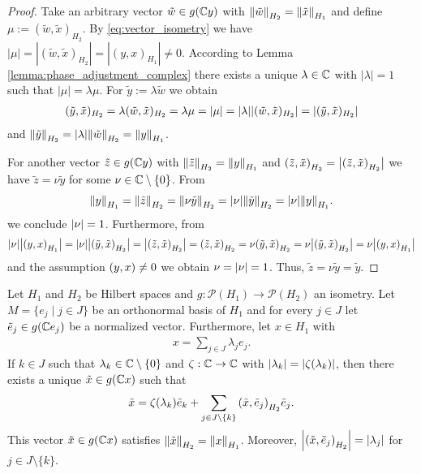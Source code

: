 \begin{proof}
	Take an arbitrary vector $\tilde{w} \in g(\C y)$ with $\norm[H_2]{\tilde{w}} = \norm[H_1]{\tilde{x}}$ and define $\mu := (\tilde{w}, \tilde{x})_{H_2}$. By \eqref{eq:vector_isometry} we have $|\mu| = |(\tilde{w},\tilde{x})_{H_2}| = |(y,x)_{H_1}| \neq 0$. According to Lemma \ref{lemma:phase_adjustment_complex} there exists a unique $\lambda \in \C$ with $|\lambda| = 1$ such that $|\mu| = \lambda \mu$. For $\tilde{y} := \lambda \tilde{w}$ we obtain
	\begin{align*}
		(\tilde{y}, \tilde{x})_{H_2} = \lambda (\tilde{w}, \tilde{x})_{H_2} = \lambda \mu = |\mu| = \vbraces{\lambda}|(\tilde{w}, \tilde{x})_{H_2}| = |(\tilde{y},\tilde{x})_{H_2}|
	\end{align*}
	and $\norm[H_2]{\tilde{y}} = |\lambda| \norm[H_2]{\tilde{w}} = \norm[H_1]{y}$.
	
	For another vector $\tilde{z} \in g\pbraces{\C y}$ with $\norm[H_2]{\tilde{z}} = \norm[H_1]{y}$ and $\pbraces{\tilde{z}, \tilde{x}}_{H_2} = \vbraces{\pbraces{\tilde{z}, \tilde{x}}_{H_2}}$ we have $\tilde{z} = \nu \tilde{y}$ for some $\nu \in \C \setminus \{0\}$. From 
	\begin{align*}
		\norm[H_1]{y} = \norm[H_2]{\tilde{z}} = \norm[H_2]{\nu \tilde{y}} = \vbraces{\nu} \norm[H_2]{\tilde{y}} = \vbraces{\nu} \norm[H_1]{y}.
	\end{align*}
	we conclude $\vbraces{\nu} = 1$. Furthermore, from 
	\begin{align*}
		\vbraces{\nu} \vbraces{\pbraces{y,x}_{H_1}} = \vbraces{\nu} \vbraces{\pbraces{\tilde{y}, \tilde{x}}_{H_2}} = \vbraces{\pbraces{\tilde{z}, \tilde{x}}_{H_2}} = \pbraces{\tilde{z}, \tilde{x}}_{H_2} = \nu \pbraces{\tilde{y}, \tilde{x}}_{H_2} = \nu \vbraces{\pbraces{\tilde{y}, \tilde{x}}_{H_2}} = \nu \vbraces{\pbraces{y, x}_{H_1}}
	\end{align*}
	and the assumption $\pbraces{y,x} \neq 0$ we obtain $\nu = \vbraces{\nu} = 1$. Thus, $\tilde{z} = \nu \tilde{y} = \tilde{y}$. 
\end{proof}


\begin{lemma} \label{lemma:aux_main}
	Let $H_1$ and $H_2$ be Hilbert spaces and $g: \mathcal{P}(H_1) \to \mathcal{P}(H_2)$ an isometry. Let $M = \{e_j \mid j \in J\}$ be an orthonormal basis of $H_1$ and for every $j \in J$ let $\tilde{e}_j \in g(\C e_j)$ be a normalized vector. Furthermore, let $x \in H_1$ with
	\begin{align*}
		x = \sum_{j \in J} \lambda_j e_j.
	\end{align*} 
	If $k \in J$ such that $\lambda_k \in \C \setminus \{0\}$ and $\zeta: \C \to \C$ with $\vbraces{\lambda_k} = \vbraces{\zeta\pbraces{\lambda_k}}$, then there exists a unique $\tilde{x} \in g(\C x)$ such that
	\begin{align*}
		\tilde{x} = \zeta(\lambda_k) \tilde{e}_k + \sum_{j \in J \setminus \{k\}} \pbraces{\tilde{x}, \tilde{e}_j}_{H_2} \tilde{e}_j.
	\end{align*}
	This vector $\tilde{x} \in g(\C x)$ satisfies $\norm[H_2]{\tilde{x}} = \norm[H_1]{x}$. Moreover, $\vbraces{\pbraces{\tilde{x}, \tilde{e}_j}_{H_2}} = \vbraces{\lambda_j}$ for $j \in J \setminus \{k\}$. 
\end{lemma}

